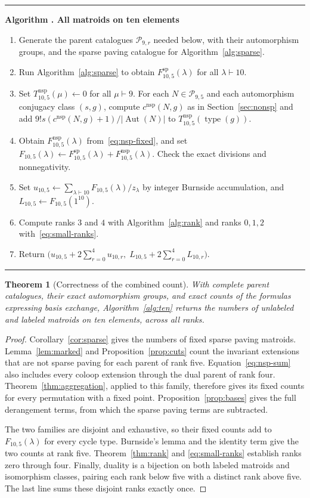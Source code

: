 \documentclass[11pt]{article}
\newtheorem{theorem}{Theorem}[section]
\theoremstyle{definition}
\newcounter{algorithm}
\newenvironment{algorithm}[1]{%
  \refstepcounter{algorithm}\par\medskip\noindent
  \begin{minipage}{\linewidth}\hrule\medskip
  \textbf{Algorithm \thealgorithm. #1}\par\smallskip
  \begin{enumerate}[label=\arabic*.,leftmargin=2.2em,itemsep=2pt,topsep=0pt]
}{\end{enumerate}\medskip\hrule\end{minipage}\par\medskip}
\DeclareMathOperator{\Aut}{Aut}
\DeclareMathOperator{\type}{type}
\newcommand{\SP}{\mathrm{sp}}
\newcommand{\nsp}{\mathrm{nsp}}
\newcommand{\Part}{\mathcal P}
\begin{document}
\begin{algorithm}{All matroids on ten elements}
\label{alg:ten}
\item Generate the parent catalogues $\Part_{9,r}$ needed below, with their
      automorphism groups, and the sparse paving catalogue for
      Algorithm~\ref{alg:sparse}.
\item Run Algorithm~\ref{alg:sparse} to obtain $F^{\SP}_{10,5}(\lambda)$ for all
      $\lambda\vdash10$.
\item Set $T^{\nsp}_{10,5}(\mu)\gets0$ for all $\mu\vdash9$.
      For each $N\in\Part_{9,5}$ and each automorphism conjugacy class
      $(s,g)$, compute $c^{\nsp}(N,g)$ as in Section~\ref{sec:nonsp} and add
      $9!s(c^{\nsp}(N,g)+1)/|\Aut(N)|$ to $T^{\nsp}_{10,5}(\type(g))$.
\item Obtain $F^{\nsp}_{10,5}(\lambda)$ from~\eqref{eq:nsp-fixed}, and set
      $F_{10,5}(\lambda)\gets F^{\SP}_{10,5}(\lambda)+F^{\nsp}_{10,5}(\lambda)$.
      Check the exact divisions and nonnegativity.
\item Set $u_{10,5}\gets\sum_{\lambda\vdash10}F_{10,5}(\lambda)/z_\lambda$
      by integer Burnside accumulation, and $L_{10,5}\gets F_{10,5}(1^{10})$.
\item Compute ranks $3$ and $4$ with Algorithm~\ref{alg:rank} and ranks
      $0,1,2$ with~\eqref{eq:small-ranks}.
\item Return
      $\bigl(u_{10,5}+2\sum_{r=0}^4u_{10,r},\;
      L_{10,5}+2\sum_{r=0}^4L_{10,r}\bigr)$.
\end{algorithm}

\begin{theorem}[Correctness of the combined count]\label{thm:ten}
With complete parent catalogues, their exact automorphism groups, and exact
counts of the formulas expressing basis exchange, Algorithm~\ref{alg:ten} returns the numbers
of unlabeled and labeled matroids on ten elements, across all ranks.
\end{theorem}
\begin{proof}
Corollary~\ref{cor:sparse} gives the numbers of fixed sparse paving matroids.
Lemma~\ref{lem:marked} and Proposition~\ref{prop:cuts} count the invariant
extensions that are not sparse paving for each parent of rank five.
Equation~\eqref{eq:nsp-sum} also includes every coloop extension through
the dual parent of rank four. Theorem~\ref{thm:aggregation}, applied to this
family, therefore gives its fixed counts for every permutation with a
fixed point. Proposition~\ref{prop:bases} gives the full derangement
terms, from which the sparse paving terms are subtracted.

The two families are disjoint and exhaustive, so their fixed counts add to
$F_{10,5}(\lambda)$ for every cycle type. Burnside's lemma and the identity
term give the two counts at rank five. Theorem~\ref{thm:rank} and
\eqref{eq:small-ranks} establish ranks zero through four. Finally, duality
is a bijection on both labeled matroids and isomorphism classes, pairing
each rank below five with a distinct rank above five. The last line sums
these disjoint ranks exactly once.
\end{proof}
\end{document}
